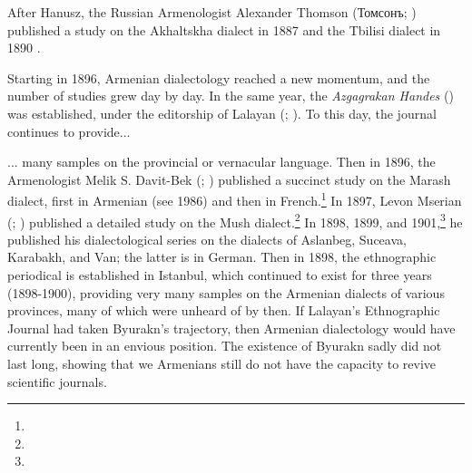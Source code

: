 After Hanusz, the Russian Armenologist Alexander Thomson (Томсонъ; ) published a study on the Akhaltskha dialect in 1887 \citep{Thomson-1887-Karin} and the Tbilisi dialect in 1890 \citep{Thomson-1890-Tiflis}. 

Starting in 1896, Armenian dialectology reached a new momentum, and the number of studies grew day by day. In the same year, the \textit{Azgagrakan Handes} (\citeauthor{AzgagrakanHandes}) was established, under the editorship of Lalayan (; ). To this day, the journal continues to provide... 



\begin{adjarianpage}\label{page:3}\end{adjarianpage}%

... many samples on the provincial or vernacular language. Then in 1896, the Armenologist Melik S. Davit-Bek (; ) published a succinct study on the Marash dialect, first in Armenian (see  1986) and then in French.\footnote{ } In 1897, Levon Mserian (; ) published a detailed study on the Mush dialect.\footnote{} In 1898, 1899, and 1901,\footnote{} he published his dialectological series on the dialects of Aslanbeg, Suceava, Karabakh, and Van; the latter is in German. Then in 1898, the \citeauthor{Byurakn} ethnographic periodical is established in Istanbul, which continued to exist for three years (1898-1900), providing very many samples on the Armenian dialects of various provinces, many of which were unheard of by then. If Lalayan's Ethnographic Journal had taken Byurakn's trajectory, then Armenian dialectology would have currently been in an envious position. The existence of Byurakn sadly did not last long, showing that we Armenians still do not have the capacity to revive scientific journals. 

